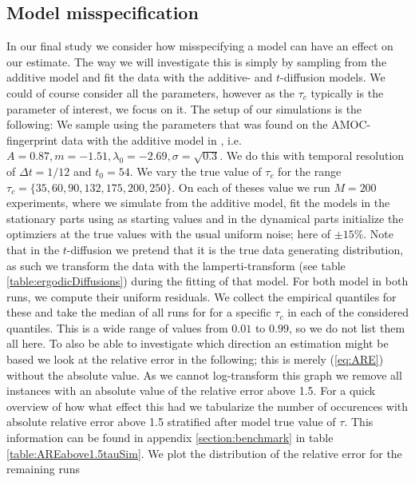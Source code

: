 \subsection{Model misspecification}
In our final study we consider how misspecifying a model can have an effect on our estimate. The way we will investigate this is simply by sampling from the additive model and fit the data with the additive- and $t$-diffusion models. We could of course consider all the parameters, however as the $\tau_c$ typically is the parameter of interest, we focus on it. The setup of our simulations is the following: We sample using the parameters that was found on the AMOC-fingerprint data with the additive model in \cite[figure 6]{Ditlevsen2023}, i.e. $A = 0.87, m = -1.51, \lambda_0 = -2.69, \sigma = \sqrt{0.3}$. We do this with temporal resolution of $\Delta t = 1/12$ and $t_0 =54$. We vary the true value of $\tau_c$ for the range $\tau_c = \{35, 60, 90, 132, 175, 200, 250\}$. On each of theses value we run $M = 200$ experiments, where we simulate from the additive model, fit the models in the stationary parts using \cite[equation (S4-S6)]{DitlevsenSupplementary} as starting values and in the dynamical parts initialize the optimziers at the true values with the usual uniform noise; here of $\pm 15\%$. Note that in the $t$-diffusion we pretend that it is the true data generating distribution, as such we transform the data with the lamperti-transform (see table \ref{table:ergodicDiffusions}) during the fitting of that model. For both model in both runs, we compute their uniform residuals. We collect the empirical quantiles for these and take the median of all runs for for a specific $\tau_c$ in each of the considered quantiles. This is a wide range of values from $0.01$ to $0.99$, so we do not list them all here. To also be able to investigate which direction an estimation might be based we look at the relative error in the following; this is merely (\ref{eq:ARE}) without the absolute value. As we cannot log-transform this graph we remove all instances with an absolute value of the relative error above 1.5. For a quick overview of how what effect this had we tabularize the number of occurences with absolute relative error above 1.5 stratified after model true value of $\tau$. This information can be found in appendix \ref{section:benchmark} in table \ref{table:AREabove1.5tauSim}. We plot the distribution of the relative error for the remaining runs 
